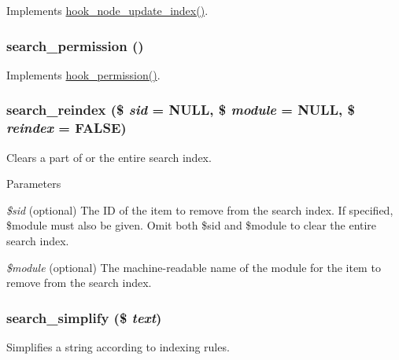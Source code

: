 \label{search_8module_ad314916727aaf74780b647fa381c89f6}
Implements \hyperlink{group__node__api__hooks_gac8420f204c69a4dc641f4d809a870b05}{hook\_\-node\_\-update\_\-index()}. \hypertarget{search_8module_a56dd5c08835642b32744dfea3762a419}{
\subsubsection[{search\_\-permission}]{\setlength{\rightskip}{0pt plus 5cm}search\_\-permission ()}}
\label{search_8module_a56dd5c08835642b32744dfea3762a419}
Implements \hyperlink{group__hooks_ga2b22b45f4925f2478412477bae329713}{hook\_\-permission()}. \hypertarget{search_8module_a66509986c2ec235db1bf94f010d6675d}{
\subsubsection[{search\_\-reindex}]{\setlength{\rightskip}{0pt plus 5cm}search\_\-reindex (\$ {\em sid} = {\ttfamily NULL}, \/  \$ {\em module} = {\ttfamily NULL}, \/  \$ {\em reindex} = {\ttfamily FALSE})}}
\label{search_8module_a66509986c2ec235db1bf94f010d6675d}
Clears a part of or the entire search index.


\begin{DoxyParams}{Parameters}
\item[{\em \$sid}](optional) The ID of the item to remove from the search index. If specified, \$module must also be given. Omit both \$sid and \$module to clear the entire search index. \item[{\em \$module}](optional) The machine-\/readable name of the module for the item to remove from the search index. \end{DoxyParams}
\hypertarget{search_8module_ac33f1e93d9bed7ebf9b4908287618beb}{
\subsubsection[{search\_\-simplify}]{\setlength{\rightskip}{0pt plus 5cm}search\_\-simplify (\$ {\em text})}}
\label{search_8module_ac33f1e93d9bed7ebf9b4908287618beb}
Simplifies a string according to indexing rules.


